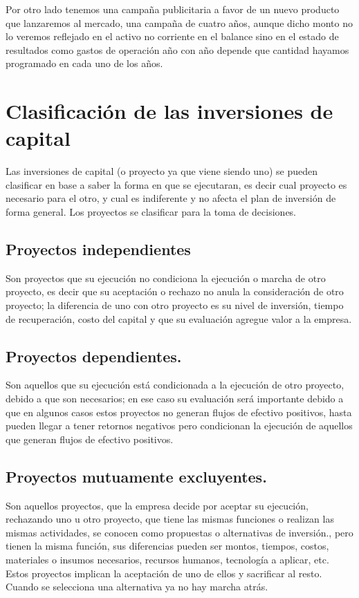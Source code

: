 \documentclass[12pt, a4paper]{article}
\begin{document}
Por otro lado tenemos una campaña publicitaria a favor de un nuevo producto que lanzaremos al mercado, una campaña de cuatro años, aunque dicho monto no lo veremos reflejado en el activo no corriente en el balance sino en el estado de resultados como gastos de operación año con año depende que cantidad hayamos programado en cada uno de los años.

\section{Clasificación de las inversiones de capital}

Las inversiones de capital (o proyecto ya que viene siendo uno) se pueden clasificar en base a saber la forma en que se ejecutaran, es decir cual proyecto es necesario para el otro, y cual es indiferente y no afecta el plan de inversión de forma general. Los proyectos se clasificar para la toma de decisiones.

\subsection{Proyectos independientes}

Son proyectos que su ejecución no condiciona la ejecución o marcha de otro proyecto, es decir que su aceptación o rechazo no anula la consideración de otro proyecto; la diferencia de uno con otro proyecto es su nivel de inversión, tiempo de recuperación, costo del capital y que su evaluación agregue valor a la empresa.

\subsection{Proyectos dependientes.}

Son aquellos que su ejecución está condicionada a la ejecución de otro proyecto, debido a que son necesarios; en ese caso su evaluación será importante debido a que en algunos casos estos proyectos no generan flujos de efectivo positivos, hasta pueden llegar a tener retornos negativos pero condicionan la ejecución de aquellos que generan flujos de efectivo positivos.

\subsection{Proyectos mutuamente excluyentes.}

Son aquellos proyectos, que la empresa decide por aceptar su ejecución, rechazando uno u otro proyecto, que tiene las mismas funciones o realizan las mismas actividades, se conocen como propuestas o alternativas de inversión., pero tienen la misma función, sus diferencias pueden ser montos, tiempos, costos, materiales o insumos necesarios, recursos humanos, tecnología a aplicar, etc. Estos proyectos implican la aceptación de uno de ellos y sacrificar al resto. Cuando se selecciona una alternativa ya no hay marcha atrás.
\end{document}
